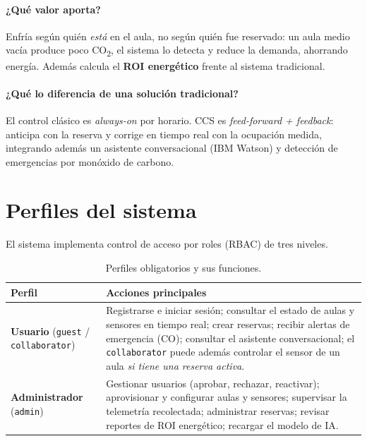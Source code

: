 \documentclass[11pt,a4paper]{article}
\begin{document}
\paragraph{¿Qué valor aporta?} Enfría según quién \emph{está} en el aula, no
según quién fue reservado: un aula medio vacía produce poco
CO\textsubscript{2}, el sistema lo detecta y reduce la demanda, ahorrando
energía. Además calcula el \textbf{ROI energético} frente al sistema tradicional.

\paragraph{¿Qué lo diferencia de una solución tradicional?} El control clásico
es \emph{always-on} por horario. CCS es \emph{feed-forward + feedback}:
anticipa con la reserva y corrige en tiempo real con la ocupación medida,
integrando además un asistente conversacional (IBM Watson) y detección de
emergencias por monóxido de carbono.

\section{Perfiles del sistema}

El sistema implementa control de acceso por roles (RBAC) de tres niveles.

\begin{table}[H]\centering\small
\begin{tabular}{@{}L{2.6cm}L{12.2cm}@{}}
\toprule
\textbf{Perfil} & \textbf{Acciones principales} \\
\midrule
\textbf{Usuario} \newline (\texttt{guest} / \texttt{collaborator}) &
Registrarse e iniciar sesión; consultar el estado de aulas y sensores en tiempo
real; crear reservas; recibir alertas de emergencia (CO); consultar el
asistente conversacional; el \texttt{collaborator} puede además controlar el
sensor de un aula \emph{si tiene una reserva activa}. \\
\addlinespace
\textbf{Administrador} \newline (\texttt{admin}) &
Gestionar usuarios (aprobar, rechazar, reactivar); aprovisionar y configurar
aulas y sensores; supervisar la telemetría recolectada; administrar reservas;
revisar reportes de ROI energético; recargar el modelo de IA. \\
\bottomrule
\end{tabular}
\caption{Perfiles obligatorios y sus funciones.}
\end{table}
\end{document}
